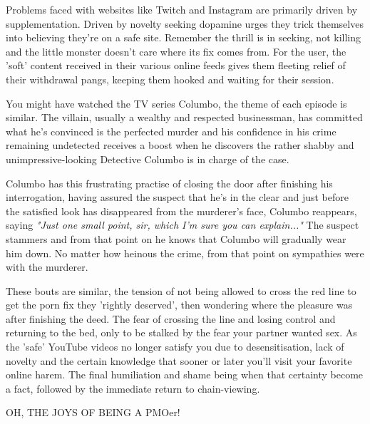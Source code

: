 \documentclass[easypeasy.tex]{subfiles}
\begin{document}
Problems faced with websites like Twitch and Instagram are primarily driven by supplementation. Driven by novelty seeking dopamine urges they trick themselves into believing they're on a safe site. Remember the thrill is in seeking, not killing and the little monster doesn't care where its fix comes from. For the user, the 'soft' content received in their various online feeds gives them fleeting relief of their withdrawal pangs, keeping them hooked and waiting for their session.

You might have watched the TV series Columbo, the theme of each episode is similar. The villain, usually a wealthy and respected businessman, has committed what he's convinced is the perfected murder and his confidence in his crime remaining undetected receives a boost when he discovers the rather shabby and unimpressive-looking Detective Columbo is in charge of the case.

Columbo has this frustrating practise of closing the door after finishing his interrogation, having assured the suspect that he's in the clear and just before the satisfied look has disappeared from the murderer's face, Columbo reappears, saying \textit{"Just one small point, sir, which I'm sure you can explain..."} The suspect stammers and from that point on he knows that Columbo will gradually wear him down. No matter how heinous the crime, from that point on sympathies were with the murderer.

These bouts are similar, the tension of not being allowed to cross the red line to get the porn fix they 'rightly deserved', then wondering where the pleasure was after finishing the deed. The fear of crossing the line and losing control and returning to the bed, only to be stalked by the fear your partner wanted sex. As the 'safe' YouTube videos no longer satisfy you due to desensitisation, lack of novelty and the certain knowledge that sooner or later you'll visit your favorite online harem. The final humiliation and shame being when that certainty become a fact, followed by the immediate return to chain-viewing.

{\huge OH, THE JOYS OF BEING A PMOer!}
\end{document}
